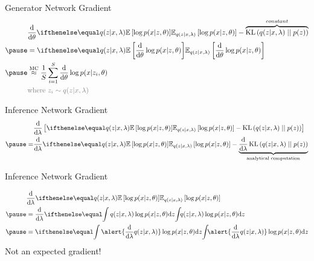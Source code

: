 \documentclass[14pt]{beamer}
\begin{document}
\begin{frame}{Generator Network Gradient}
\vspace{-10pt}
\begin{equation*}
\begin{aligned}
&\dv{\theta}\E[q(z|x,\lambda)]{\log p(x|z,\theta)} - \overbrace{\KL{q(z|x,\lambda)}{p(z)}}^{constant} \\ \pause 
&=\E[q(z|x,\lambda)]{\dv{\theta}\log p(x|z,\theta)} \\ \pause
&\overset{\text{MC}}{\approx} \frac{1}{S}\sum_{i=1}^{S}
\dv{\theta} \log p(x|z_{i},\theta) \\
&\textcolor{gray}{\text{where }z_i \sim q(z|x, \lambda)}
\end{aligned}
\end{equation*}
\pause
{}
\end{frame}

\begin{frame}{Inference Network Gradient}
\begin{equation*}
\begin{aligned}
&\dv{\lambda}\left[\E[q(z|x,\lambda)]{\log p(x|z,\theta)} - \KL{q(z|x,\lambda)}{p(z)} \right] \\ \pause
=&\dv{\lambda}\E[q(z|x,\lambda)]{\log p(x|z,\theta)} - \underbrace{\dv{\lambda}\KL{q(z|x,\lambda)}{p(z)}}_{\text{analytical computation}} \\
\end{aligned}
\end{equation*}
\pause
{}
\end{frame}

\begin{frame}{Inference Network Gradient}


\begin{equation*}
\begin{aligned}
&\dv{\lambda}\E[q(z|x,\lambda)]{\log p(x|z,\theta)} \\ \pause
&= \dv{\lambda} \intl{q(z|x,\lambda)\log p(x|z,\theta)}{z} \\ \pause
&= \intl{\alert{\dv{\lambda} q(z|x,\lambda)}\log p(x|z,\theta)}{z}
\end{aligned}
\end{equation*}
\pause
Not an expected gradient!
\end{frame}
\end{document}
